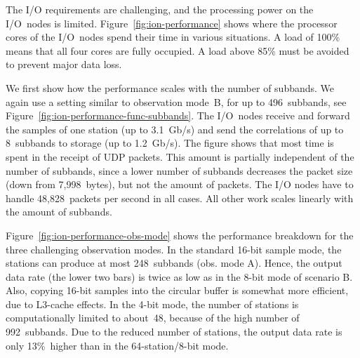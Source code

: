 \documentclass{sig-alternate}
\begin{document}
The I/O requirements are challenging, and the processing power on the I/O~nodes
is limited.
Figure~\ref{fig:ion-performance} shows where the processor cores of the
I/O~nodes spend their time in various situations.
A load of 100\% means that all four cores are fully occupied.
A load above 85\% must be avoided to prevent major data loss.

We first show how the performance scales with the number of subbands.
We again use a setting similar to observation mode~\textsf{B}, for up to
496~subbands, see Figure~\ref{fig:ion-performance-func-subbands}.
The I/O~nodes receive and forward the samples
of one station (up to 3.1~Gb/s) and send the correlations of up to 8~subbands
to storage (up to 1.2~Gb/s).
The figure shows that most time is spent in the receipt of UDP packets.
This amount is partially independent of the number of subbands, since a lower
number of subbands decreases the packet size (down from 7,998~bytes), but not
the amount of packets. The I/O nodes have to handle 48,828~packets per second in all cases.
All other work scales linearly with the amount of subbands.

Figure~\ref{fig:ion-performance-obs-mode} shows the performance breakdown
for the three challenging observation modes.
In the standard 16-bit sample mode, the stations can produce at most
248~subbands (obs. mode A).
Hence, the output data rate (the lower two bars) is twice as low as in the
8-bit mode of scenario B.
Also, copying 16-bit samples into the circular buffer is somewhat more
efficient, due to L3-cache effects.
In the 4-bit mode, the number of stations is computationally limited to
about~48, because of the high number of 992~subbands.
Due to the reduced number of stations, the output data rate is only 13\%~higher
than in the 64-station/8-bit mode.


\end{document}
